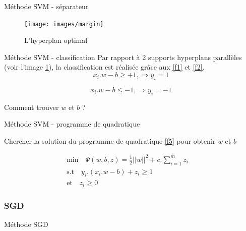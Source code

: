 \documentclass[11pt]{beamer}
\begin{document}
\begin{otherlanguage}{french}
\begin{frame}{Méthode SVM - séparateur}
\begin{figure}[ht!]
\centering
\texttt{[image: images/margin]}
\caption{L'hyperplan optimal}
\label{max_margin}
\end{figure}

\end{frame}

\begin{frame}{Méthode SVM - classification}
Par rapport à 2 supports hyperplans parallèles (voir l'image \ref{max_margin}), la classification est réalisée grâce aux \ref{f1} et \ref{f2}.
\begin{equation}
x_i.w - b \geq +1, \Rightarrow y_i = 1
\label{f1}
\end{equation}

\begin{equation}
x_i.w - b \leq -1, \Rightarrow y_i = -1
\label{f2}
\end{equation}

Comment trouver $w$ et $b$ ?

\end{frame}

\begin{frame}{Méthode SVM - programme de quadratique}

Chercher la solution du programme de quadratique \ref{f5} pour obtenir $w$ et $b$

\begin{equation}
\begin{split}
\mbox{min}\quad \Psi(w, b, z) = \frac{1}{2} ||w||^2 + c.\sum\limits_{i=1}^m z_i\quad \\ \mbox{s.t} \quad y_i.(x_i.w - b) + z_i \geq 1 \\ \mbox{et} \quad z_i \geq 0
\end{split}
\label{f5}
\end{equation}

\end{frame}







\subsubsection*{SGD}
\begin{frame}{Méthode SGD}


\end{frame}
\end{otherlanguage}
\end{document}
